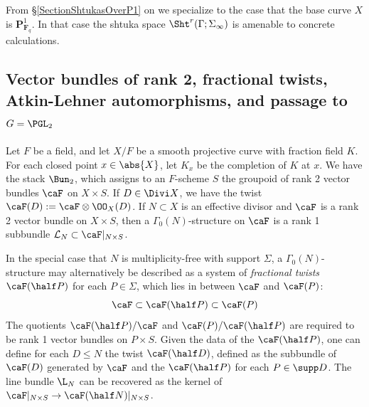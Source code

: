 \documentclass{article}
\def\F{\mathbf{F}}
\def\P{\mathbf{P}}
\begin{document}
From \S\ref{SectionShtukasOverP1} on we specialize to the case that the base curve $X$ is $\P^1_{\F_q}$.   In that case the shtuka space $\Sht^r(\Gamma;\Sigma_\infty)$ is amenable to concrete calculations.


\subsection{Vector bundles of rank 2, fractional twists, Atkin-Lehner automorphisms, and passage to $G=\PGL_2$}

Let $F$ be a field, and let $X/F$ be a smooth projective curve with fraction field $K$.  For each closed point $x\in \abs{X}$, let $K_x$ be the completion of $K$ at $x$.  We have the stack $\Bun_2$, which assigns to an $F$-scheme $S$ the groupoid of rank 2 vector bundles $\caF$ on $X\times S$.   If $D\in \Divi X$, we have the twist $\caF(D):=\caF\otimes \OO_X(D)$.  If $N\subset X$ is an effective divisor and $\caF$ is a rank 2 vector bundle on $X\times S$, then a $\Gamma_0(N)$-structure on $\caF$ is a rank 1 subbundle $\mathcal{L}_N\subset \caF\vert_{N\times S}$.


In the special case that $N$ is multiplicity-free with support $\Sigma$, a $\Gamma_0(N)$-structure may alternatively be described as a system of {\em fractional twists} $\caF(\half P)$ for each $P\in \Sigma$, which lies in between $\caF$ and $\caF(P)$:
\[ \caF\subset \caF(\half P) \subset \caF(P)\]
The quotients $\caF(\half P)/\caF$ and $\caF(P)/\caF(\half P)$ are required to be rank 1 vector bundles on $P\times S$.  Given the data of the $\caF(\half P)$, one can define for each $D\leq N$ the twist $\caF(\half D)$, defined as the subbundle of $\caF(D)$ generated by $\caF$ and the $\caF(\half P)$ for each $P\in \supp D$.  The line bundle $\L_N$ can be recovered as the kernel of $\caF\vert_{N\times S} \to \caF(\half N)\vert_{N\times S}$.  
\end{document}
